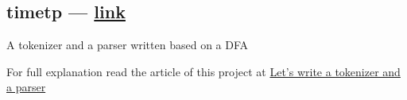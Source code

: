\begin{multicols}{2}
\subsection{{timetp --- \href{https://github.com/mahdihaghverdi/timetp}{link}}}
\begin{zitemize}
\item A tokenizer and a parser written based on a DFA
\item For full explanation read the article of this project at \href{https://virgool.io/@liewpl/tokenizer-parser-in-python-ubzlsvukmdxz}{Let's write a tokenizer and a parser}
\end{zitemize}
\end{multicols}